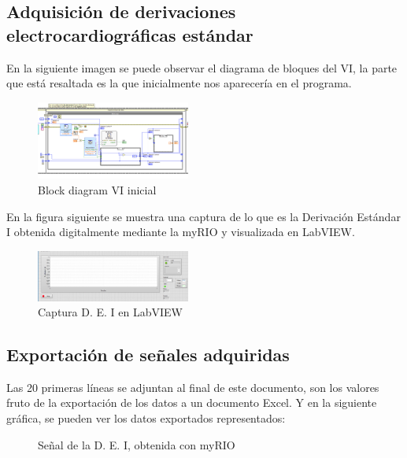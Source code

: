 \documentclass[conference]{IEEEtran}
\begin{document}
\subsection{Adquisición de derivaciones electrocardiográficas estándar}
En la siguiente imagen se puede observar el diagrama de bloques del VI, la parte que está resaltada es la que inicialmente nos aparecería en el programa.
\begin{figure}[H]
    \centerline{\includegraphics[width=0.45\textwidth]{e_diagramVI.png}}
    \caption{Block diagram VI inicial}
    \end{figure}

En la figura siguiente se muestra una captura de lo que es la Derivación Estándar I obtenida digitalmente mediante la myRIO y visualizada en LabVIEW.
\begin{figure}[H]
    \centerline{\includegraphics[width=0.45\textwidth]{e_captura.png}}
    \caption{Captura D. E. I en LabVIEW}
    \end{figure}

\subsection{Exportación de señales adquiridas}
Las 20 primeras líneas se adjuntan al final de este documento, son los valores fruto de la exportación de los datos a un documento Excel.
Y en la siguiente gráfica, se pueden ver los datos exportados representados:
\begin{figure}[H]
    \caption{Señal de la D. E. I, obtenida con myRIO}
    \label{g_myRIO}
    \end{figure}
\end{document}

